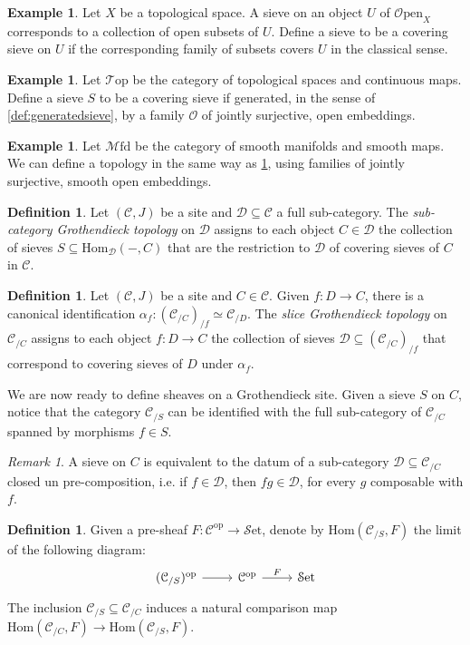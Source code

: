 \documentclass[a4paper]{book}
\newcommand{\lC}{\mathcal{C}}
\newcommand{\lD}{\mathcal{D}}
\newcommand{\lM}{\mathcal{M}}
\newcommand{\lO}{\mathcal{O}}
\newcommand{\lS}{\mathcal{S}}
\newcommand{\lT}{\mathcal{T}}
\newcommand{\op}{\mathrm{op}}
\newcommand{\set}{\lS\mathrm{et}} %
\newcommand{\Top}{\lT\op} %
\newcommand{\Open}{\lO\mathrm{pen}} %
\renewcommand{\hom}{\mathrm{Hom}} %
\newcommand{\Mfd}{\lM\mathrm{fd}} %
\theoremstyle{definition}
\newtheorem{definition}[equation]{Definition}
\newtheorem{example}[equation]{Example}
\theoremstyle{remark}
\newtheorem{remark}[equation]{Remark}
\numberwithin{equation}{section}
\begin{document}
	\begin{example}
		Let $X$ be a topological space. A sieve on an object $U$ of $\Open_X$ corresponds to a collection of open subsets of $U$. Define a sieve to be a covering sieve on $U$ if the corresponding family of subsets covers $U$ in the classical sense.
	\end{example}
	\begin{example}\label{ex:top}
		Let $\Top$ be the category of topological spaces and continuous maps. Define a sieve $S$ to be a covering sieve if generated, in the sense of \cref{def:generatedsieve}, by a family $\lO$ of jointly surjective, open embeddings. 
	\end{example}
	\begin{example}Let $\Mfd$ be the category of smooth manifolds and smooth maps. We can define a topology in the same way as \cref{ex:top}, using families of jointly surjective, smooth open embeddings. 
	\end{example}
	\begin{definition}\label{def:indtop}
		Let $(\lC,J)$ be a site and $\lD\subseteq\lC$ a full sub-category. The \emph{sub-category Grothendieck topology} on $\lD$ assigns to each object $C\in\lD$ the collection of sieves $S\subseteq\hom_{\lD}(-,C)$ that are the restriction to $\lD$ of covering sieves of $C$ in $\lC$.
	\end{definition}
	\begin{definition}\label{def:slicetop}
		Let $(\lC,J)$ be a site and $C\in\lC$. Given $f:D\to C$, there is a canonical identification $\alpha_f:(\lC_{/C})_{/f}\simeq\lC_{/D}$. The \emph{slice Grothendieck topology} on $\lC_{/C}$ assigns to each object $f:D\to C$ the collection of sieves $\lD\subseteq(\lC_{/C})_{/f}$ that correspond to covering sieves of $D$ under $\alpha_f$. 
	\end{definition}
	We are now ready to define sheaves on a Grothendieck site. Given a sieve $S$ on $C$, notice that the category $\lC_{/S}$ can be identified with the full sub-category of $\lC_{/C}$ spanned by morphisms $f\in S$.
	\begin{remark}
		A sieve on $C$ is equivalent to the datum of a sub-category $\lD\subseteq\lC_{/C}$ closed un pre-composition, i.e. if $f\in\lD$, then $fg\in\lD$, for every $g$ composable with $f$. 
	\end{remark} 
	\begin{definition}\label{map}
		Given a pre-sheaf $F\colon \lC^{\op}\to\set$, denote by $\hom(\lC_{/S},F)$ the limit of the following diagram:
	\begin{equation}\label{eq:comparison}
		\begin{tikzcd}
			(\lC_{/S})^{\op}\arrow[r] & \lC^{\op}\arrow[r,"F"] & \set
		\end{tikzcd}
	\end{equation}The inclusion $\lC_{/S}\subseteq\lC_{/C}$ induces a natural \textnormal{comparison map} $\hom(\lC_{/C},F)\to\hom(\lC_{/S},F)$.
	\end{definition}
\end{document}
